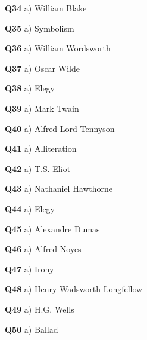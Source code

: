 \textbf{Q34} a) William Blake\par
\textbf{Q35} a) Symbolism\par
\textbf{Q36} a) William Wordsworth\par
\textbf{Q37} a) Oscar Wilde\par
\textbf{Q38} a) Elegy\par
\textbf{Q39} a) Mark Twain\par
\textbf{Q40} a) Alfred Lord Tennyson\par
\textbf{Q41} a) Alliteration\par
\textbf{Q42} a) T.S. Eliot\par
\textbf{Q43} a) Nathaniel Hawthorne\par
\textbf{Q44} a) Elegy\par
\textbf{Q45} a) Alexandre Dumas\par
\textbf{Q46} a) Alfred Noyes\par
\textbf{Q47} a) Irony\par
\textbf{Q48} a) Henry Wadsworth Longfellow\par
\textbf{Q49} a) H.G. Wells\par
\textbf{Q50} a) Ballad\par